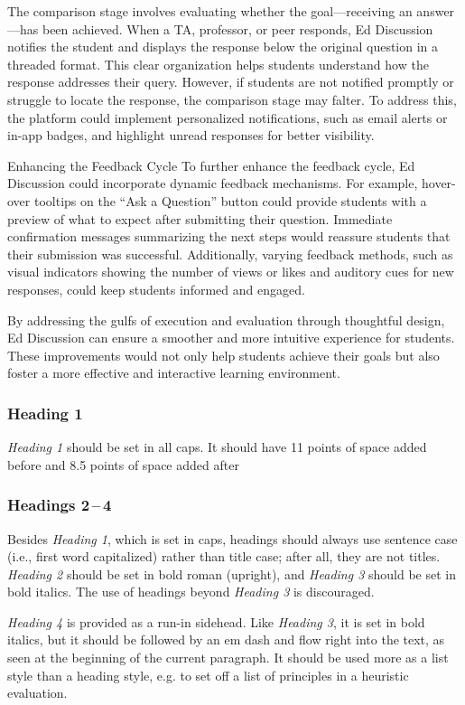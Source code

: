 \documentclass[
	letterpaper, %
]{jdf}
\begin{document}
The comparison stage involves evaluating whether the goal—receiving an answer—has been achieved. When a TA, professor, or peer responds, Ed Discussion notifies the student and displays the response below the original question in a threaded format. This clear organization helps students understand how the response addresses their query. However, if students are not notified promptly or struggle to locate the response, the comparison stage may falter. To address this, the platform could implement personalized notifications, such as email alerts or in-app badges, and highlight unread responses for better visibility.

Enhancing the Feedback Cycle
To further enhance the feedback cycle, Ed Discussion could incorporate dynamic feedback mechanisms. For example, hover-over tooltips on the “Ask a Question” button could provide students with a preview of what to expect after submitting their question. Immediate confirmation messages summarizing the next steps would reassure students that their submission was successful. Additionally, varying feedback methods, such as visual indicators showing the number of views or likes and auditory cues for new responses, could keep students informed and engaged.

By addressing the gulfs of execution and evaluation through thoughtful design, Ed Discussion can ensure a smoother and more intuitive experience for students. These improvements would not only help students achieve their goals but also foster a more effective and interactive learning environment.

\subsubsection{Heading 1}
\emph{Heading 1} should be set in all caps. It should have 11 points of space added before and 8.5 points of space added after

\subsubsection{Headings 2\,–\,4}
Besides \emph{Heading 1}, which is set in caps, headings should always use sentence case (i.e., first word capitalized) rather than title case; after all, they are not titles. \emph{Heading 2} should be set in bold roman (upright), and \emph{Heading 3} should be set in bold italics. The use of headings beyond \emph{Heading 3} is discouraged.

\emph{Heading 4} is provided as a run-in sidehead. Like \emph{Heading 3}, it is set in bold italics, but it should be followed by an em dash and flow right into the text, as seen at the beginning of the current paragraph. It should be used more as a list style than a heading style, e.g. to set off a list of principles in a heuristic evaluation.
\end{document}

